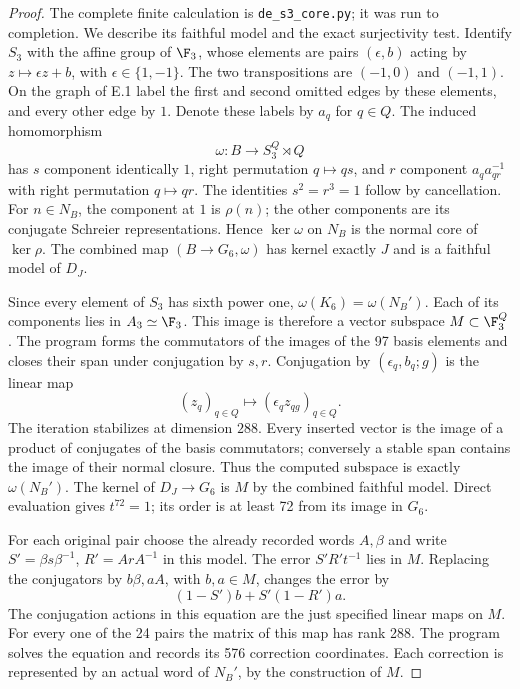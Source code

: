 \begin{proof}
The complete finite calculation is \texttt{de\_s3\_core.py}; it was
run to completion. We describe its faithful model and the exact
surjectivity test. Identify $S_3$ with the affine group of $\F_3$,
whose elements are pairs $(\epsilon,b)$ acting by
$z\mapsto\epsilon z+b$, with $\epsilon\in\{1,-1\}$.
The two transpositions are $(-1,0)$ and $(-1,1)$.
On the graph of E.1 label the first and second omitted edges by
these elements, and every other edge by $1$. Denote these labels
by $a_q$ for $q\in Q$. The induced homomorphism
\[
 \omega:B\longrightarrow S_3^Q\rtimes Q
\]
has $s$ component identically $1$, right permutation $q\mapsto qs$,
and $r$ component $a_q a_{qr}^{-1}$ with right permutation
$q\mapsto qr$. The identities $s^2=r^3=1$ follow by cancellation.
For $n\in N_B$, the component at $1$ is $\rho(n)$; the other
components are its conjugate Schreier representations. Hence
$\ker\omega$ on $N_B$ is the normal core of $\ker\rho$.
The combined map $(B\to G_6,\omega)$ has kernel exactly $J$ and
is a faithful model of $D_J$.

Since every element of $S_3$ has sixth power one,
$\omega(K_6)=\omega(N_B')$. Each of its components lies in
$A_3\simeq\F_3$. This image is therefore a vector subspace
$M\subset\F_3^Q$. The program forms the commutators of the images
of the 97 basis elements and closes their span under conjugation
by $s,r$. Conjugation by $(\epsilon_q,b_q;g)$ is the linear map
\[
 (z_q)_{q\in Q}\longmapsto
       (\epsilon_q z_{qg})_{q\in Q}.
\]
The iteration stabilizes at dimension $288$. Every inserted vector
is the image of a product of conjugates of the basis commutators;
conversely a stable span contains the image of their normal closure.
Thus the computed subspace is exactly $\omega(N_B')$.
The kernel of $D_J\to G_6$ is $M$ by the combined faithful model.
Direct evaluation gives $t^{72}=1$; its order is at least 72 from
its image in $G_6$.

For each original pair choose the already recorded words $A,\beta$
and write $S'=\beta s\beta^{-1}$, $R'=ArA^{-1}$ in this model.
The error $S'R't^{-1}$ lies in $M$. Replacing the conjugators by
$b\beta,aA$, with $b,a\in M$, changes the error by
\[
 (1-S')b+S'(1-R')a.
\]
The conjugation actions in this equation are the just specified
linear maps on $M$. For every one of the 24 pairs the matrix of
this map has rank 288. The program solves the equation and records
its 576 correction coordinates. Each correction is represented by
an actual word of $N_B'$, by the construction of $M$.


\end{proof}
